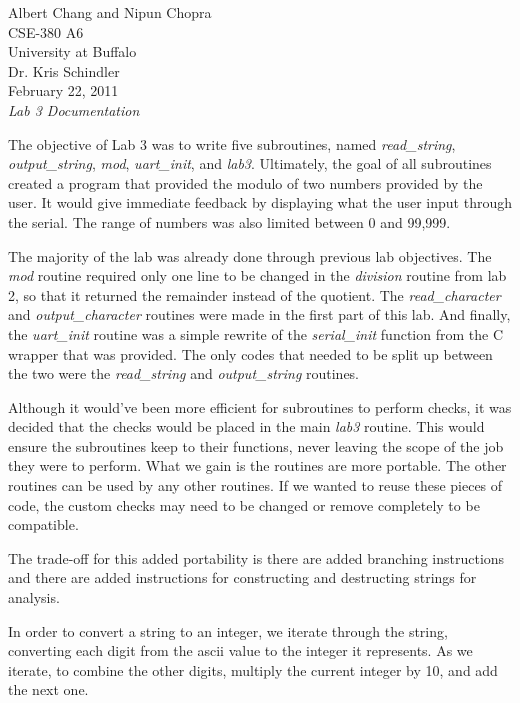 \documentclass[letterpaper,10pt]{article}
\begin{document}
    Albert Chang and Nipun Chopra\\
    CSE-380 A6\\
    University at Buffalo\\
    Dr. Kris Schindler\\
    February 22, 2011\\
    \textit{Lab 3 Documentation}

    The objective of Lab 3 was to write five subroutines, named
    \textit{read\_string}, \textit{output\_string}, \textit{mod},
    \textit{uart\_init}, and \textit{lab3}. Ultimately, the goal of all
    subroutines created a program that provided the modulo of two numbers
    provided by the user. It would give immediate feedback by displaying what
    the user input through the serial. The range of numbers was also limited
    between 0 and 99,999.

    The majority of the lab was already done through previous lab objectives.
    The \textit{mod} routine required only one line to be changed in the
    \textit{division} routine from lab 2, so that it returned the remainder
    instead of the quotient. The \textit{read\_character} and
    \textit{output\_character} routines were made in the first part of this lab.
    And finally, the \textit{uart\_init} routine was a simple rewrite of the
    \textit{serial\_init} function from the C wrapper that was provided. The
    only codes that needed to be split up between the two were the
    \textit{read\_string} and \textit{output\_string} routines.

    Although it would've been more efficient for subroutines to perform checks,
    it was decided that  the checks would be placed in the main \textit{lab3}
    routine. This would ensure the subroutines keep to their functions, never
    leaving the scope of the job they were to perform. What we gain is the
    routines are more portable. The other routines can be used by any other
    routines. If we wanted to reuse these pieces of code, the custom checks may
    need to be changed or remove completely to be compatible.
    
    The trade-off for this added portability is there are added branching
    instructions and there are added instructions for constructing and
    destructing strings for analysis.

    In order to convert a string to an integer, we iterate through the string,
    converting each digit from the ascii value to the integer it represents.
    As we iterate, to combine the other digits, multiply the current integer
    by 10, and add the next one.
\end{document}
